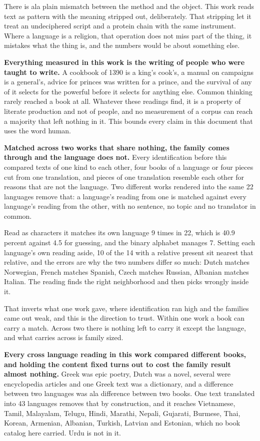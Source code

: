 There is ala plain mismatch between the method and the object. This work reads text as pattern with the meaning stripped out, deliberately. That stripping let it treat an undeciphered script and a protein chain with the same instrument. Where a language is a religion, that operation does not miss part of the thing, it mistakes what the thing is, and the numbers would be about something else.

\textbf{Everything measured in this work is the writing of people who were taught to write.} A cookbook of 1390 is a king's cook's, a manual on campaigns is a general's, advice for princes was written for a prince, and the survival of any of it selects for the powerful before it selects for anything else. Common thinking rarely reached a book at all. Whatever these readings find, it is a property of literate production and not of people, and no measurement of a corpus can reach a majority that left nothing in it. This bounds every claim in this document that uses the word human.

\textbf{Matched across two works that share nothing, the family comes through and the language does not.} Every identification before this compared texts of one kind to each other, four books of a language or four pieces cut from one translation, and pieces of one translation resemble each other for reasons that are not the language. Two different works rendered into the same 22 languages remove that: a language's reading from one is matched against every language's reading from the other, with no sentence, no topic and no translator in common.

Read as characters it matches its own language 9 times in 22, which is 40.9 percent against 4.5 for guessing, and the binary alphabet manages 7. Setting each language's own reading aside, 10 of the 14 with a relative present sit nearest that relative, and the errors are why the two numbers differ so much: Dutch matches Norwegian, French matches Spanish, Czech matches Russian, Albanian matches Italian. The reading finds the right neighborhood and then picks wrongly inside it.

That inverts what one work gave, where identification ran high and the families came out weak, and this is the direction to trust. Within one work a book can carry a match. Across two there is nothing left to carry it except the language, and what carries across is family sized.

\textbf{Every cross language reading in this work compared different books, and holding the content fixed turns out to cost the family result almost nothing.} Greek was epic poetry, Dutch was a novel, several were encyclopedia articles and one Greek text was a dictionary, and a difference between two languages was ala difference between two books. One text translated into 43 languages removes that by construction, and it reaches Vietnamese, Tamil, Malayalam, Telugu, Hindi, Marathi, Nepali, Gujarati, Burmese, Thai, Korean, Armenian, Albanian, Turkish, Latvian and Estonian, which no book catalog here carried. Urdu is not in it.

